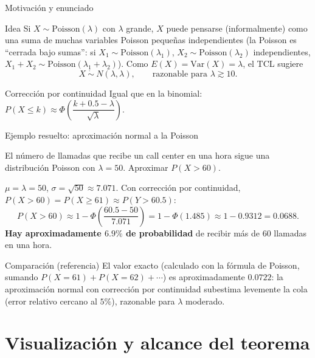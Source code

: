 \documentclass[aspectratio=169,11pt]{beamer}
\begin{document}
\begin{frame}{Motivación y enunciado}
\begin{block}{Idea}
Si $X\sim\text{Poisson}(\lambda)$ con $\lambda$ grande, $X$ puede pensarse (informalmente) como una suma de muchas variables Poisson pequeñas independientes (la Poisson es ``cerrada bajo sumas'': si $X_1\sim\text{Poisson}(\lambda_1)$, $X_2\sim\text{Poisson}(\lambda_2)$ independientes, $X_1+X_2\sim\text{Poisson}(\lambda_1+\lambda_2)$). Como $E(X)=\text{Var}(X)=\lambda$, el TCL sugiere
\[
X \ \dot\sim\ N(\lambda, \lambda), \qquad \text{razonable para } \lambda \gtrsim 10.
\]
\end{block}

\begin{alertblock}{Corrección por continuidad}
Igual que en la binomial: $P(X\leq k) \approx \Phi\!\left(\dfrac{k+0.5-\lambda}{\sqrt\lambda}\right)$.
\end{alertblock}
\end{frame}

\begin{frame}{Ejemplo resuelto: aproximación normal a la Poisson}
\begin{example}
El número de llamadas que recibe un call center en una hora sigue una distribución Poisson con $\lambda = 50$. Aproximar $P(X > 60)$.
\end{example}

\medskip
$\mu=\lambda=50$, $\sigma=\sqrt{50}\approx 7.071$. Con corrección por continuidad, $P(X>60) = P(X\geq 61) \approx P(Y > 60.5)$:
\[
P(X>60) \approx 1-\Phi\!\left(\frac{60.5-50}{7.071}\right) = 1-\Phi(1.485) \approx 1-0.9312 = 0.0688.
\]
\textbf{Hay aproximadamente $6.9\%$ de probabilidad} de recibir más de $60$ llamadas en una hora.

\medskip
\begin{block}{Comparación (referencia)}
El valor exacto (calculado con la fórmula de Poisson, sumando $P(X=61)+P(X=62)+\cdots$) es aproximadamente $0.0722$: la aproximación normal con corrección por continuidad subestima levemente la cola (error relativo cercano al $5\%$), razonable para $\lambda$ moderado.
\end{block}
\end{frame}

\section{Visualización y alcance del teorema}
\end{document}
